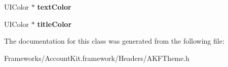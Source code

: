 \begin{DoxyCompactItemize}
\item 
\hypertarget{interface_a_k_f_theme_abb3adf8b22657c4c7eeb0e9a18f2c93d}{}U\+I\+Color $\ast$ {\bfseries text\+Color}\label{interface_a_k_f_theme_abb3adf8b22657c4c7eeb0e9a18f2c93d}

\item 
\hypertarget{interface_a_k_f_theme_a267d1207150f3f921a70edcdfcfe6b3b}{}U\+I\+Color $\ast$ {\bfseries title\+Color}\label{interface_a_k_f_theme_a267d1207150f3f921a70edcdfcfe6b3b}

\end{DoxyCompactItemize}


The documentation for this class was generated from the following file\+:\begin{DoxyCompactItemize}
\item 
Frameworks/\+Account\+Kit.\+framework/\+Headers/A\+K\+F\+Theme.\+h\end{DoxyCompactItemize}
